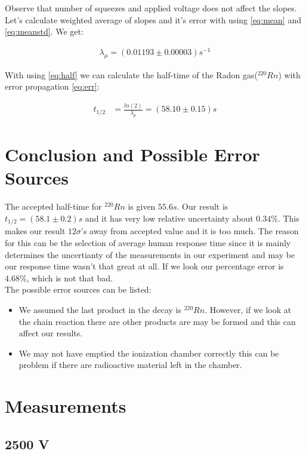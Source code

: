 \documentclass[reprint,amsmath,aps,nofootinbib,english]{revtex4-2}
\begin{document}
Observe that number of squeezes and applied voltage does not affect the slopes. \\

Let's calculate weighted average of slopes and it's error with using \eqref{eq:mean} and \eqref{eq:meanstd}. We get:

\begin{align}
  \lambda_\mu = (0.01193 \pm 0.00003) s^{-1}
\end{align} 

With using \eqref{eq:half} we can calculate the half-time of the Radon gas($^{220}Rn$) with error propagation \eqref{eq:err}:

\begin{align}
    t_{1/2} &= \frac{ln(2)}{\lambda_\mu} = (58.10 \pm 0.15) s 
\end{align}


\section{Conclusion and Possible Error Sources}
The accepted half-time for $^{220}Rn$ is given $55.6 s$. Our result is $ t_{1/2} =(58.1 \pm 0.2) s $ and it has very low relative uncertainty about $0.34 \%$. This makes our result  $12 \sigma$'s away from accepted value and it is too much. The reason for this can be the selection of average human response time since it is mainly determines the uncertianty of the measurements in our experiment and may be our response time wasn't that great at all. If we look our percentage error is $4.68\%$, which is not that bad.\\

The possible error sources can be listed:

\begin{itemize}
  \item We assumed the last product in the decay is $^{220}Rn$. However, if we look at the chain reaction there are other products are may be formed and this can affect our results.\cite{conc}
  \item We may not have emptied the ionization chamber correctly this can be problem if there are radioactive material left in the chamber.
\end{itemize}
\newpage
\appendix
\section{Measurements}

\subsection{2500 V}
\end{document}
